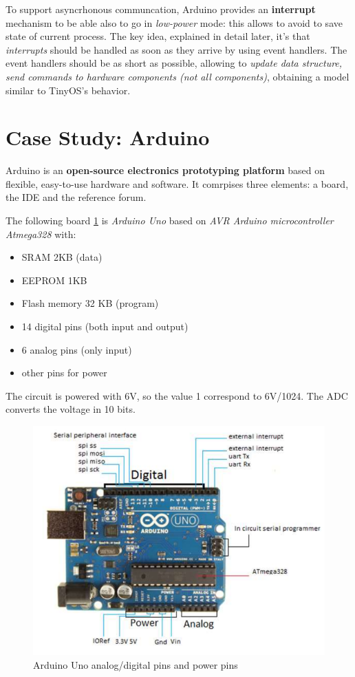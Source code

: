 \documentclass[10pt,a4paper]{report}
\theoremstyle{definition}
\begin{document}
To support asyncrhonous communcation, Arduino provides an \textbf{interrupt} mechanism to be able also to go in \textit{low-power} mode: this allows to avoid to save state of current process. The key idea, explained in detail later, it's that \textit{interrupts} should be handled as soon as they arrive by using event handlers. The event handlers should be as short as possible, allowing to \textit{update data structure, send commands to hardware components (not all components)}, obtaining a model similar to TinyOS's behavior.
\section{Case Study: Arduino}\label{sec:case-study-arduino}
Arduino is an \textbf{open-source electronics prototyping platform} based on flexible, easy-to-use hardware and software. It comrpises three elements: a board, the IDE and the reference forum.

The following board \ref{arduino-uno-pin-circuit-schema} is \textit{Arduino Uno} based on \textit{AVR Arduino microcontroller Atmega328} with:
\begin{itemize}
	\item 
	SRAM 2KB (data)
	\item 
	EEPROM 1KB
	\item 
	Flash memory 32 KB (program)
	\item 
	14 digital pins (both input and output)
	\item 
	6 analog pins (only input)
	\item 
	other pins for power
	
\end{itemize}

The circuit is powered with 6V, so the value 1 correspond to 6V/1024. The ADC converts the voltage in 10 bits.
\begin{figure}
	\centering\includegraphics[scale=0.50]{images/Pasted image 20230418122207.png}
	\caption{Arduino Uno analog/digital pins and power pins}
	\label{arduino-uno-pin-circuit-schema}
\end{figure}
\end{document}
